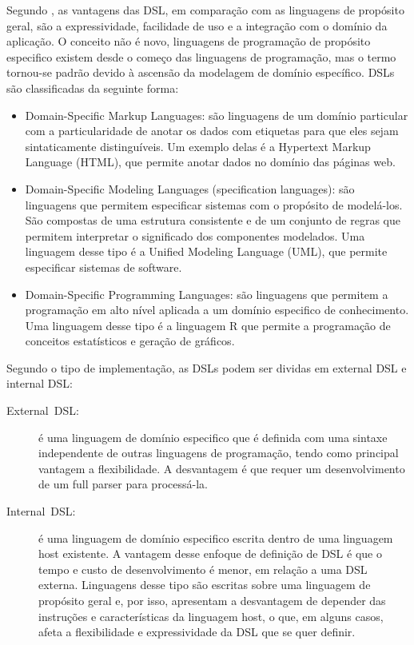 Segundo \citet{Mernik:2005:DDL:1118890.1118892}, as vantagens das
DSL, em comparação com as linguagens de propósito geral, são a expressividade,
facilidade de uso e a integração com o domínio da aplicação. O conceito
não é novo, linguagens de programação de propósito especifico existem
desde o começo das linguagens de programação, mas o termo tornou-se
padrão devido à ascensão da modelagem de domínio específico. DSLs
são classificadas da seguinte forma:
%
\begin{itemize}
\item Domain-Specific Markup Languages\foreignlanguage{brazil}{: são linguagens
de um domínio particular com a particularidade de anotar os dados
com etiquetas para que eles sejam sintaticamente distinguíveis. Um
exemplo delas é a }Hypertext Markup Language (HTML),\foreignlanguage{brazil}{
que permite anotar dados no domínio das páginas web.}
\item Domain-Specific Modeling Languages (specification languages):\foreignlanguage{brazil}{
são linguagens que permitem especificar sistemas com o propósito de
modelá-los. São compostas de uma estrutura consistente e de um conjunto
de regras que permitem interpretar o significado dos componentes modelados.
Uma linguagem desse tipo é a }Unified Modeling Language\foreignlanguage{brazil}{
(}UML\foreignlanguage{brazil}{),
que permite especificar sistemas de software.}
\item Domain-Specific Programming Languages:\foreignlanguage{brazil}{ são
linguagens que permitem a programação em alto nível aplicada a um
domínio especifico de conhecimento. Uma linguagem desse tipo é a linguagem
R que permite a programação de conceitos estatísticos e geração de
gráficos.}
\end{itemize}
%
Segundo o tipo de implementação, as DSLs podem ser dividas em \foreignlanguage{english}{external
DSL e internal DSL}\citep{fowler2010domain}:
%
\begin{description}
\item [{External\ DSL:}] \foreignlanguage{brazil}{é uma linguagem de domínio
especifico que é definida com uma sintaxe independente de outras linguagens
de programação, tendo como principal vantagem a flexibilidade. A desvantagem
é que requer um desenvolvimento de um }full\foreignlanguage{brazil}{
parser para processá-la.}
\item [{Internal\ DSL:}] \foreignlanguage{brazil}{é uma linguagem de domínio
especifico escrita dentro de uma linguagem }host\foreignlanguage{brazil}{
existente. A vantagem desse enfoque de definição de DSL é que o tempo
e custo de desenvolvimento é menor, em relação a uma DSL externa.
Linguagens desse tipo são escritas sobre uma linguagem de propósito
geral e, por isso, apresentam a desvantagem de depender das instruções
e características da linguagem }host,\foreignlanguage{brazil}{ o que,
em alguns casos, afeta a flexibilidade e expressividade da DSL que
se quer definir.}
\end{description}
%

